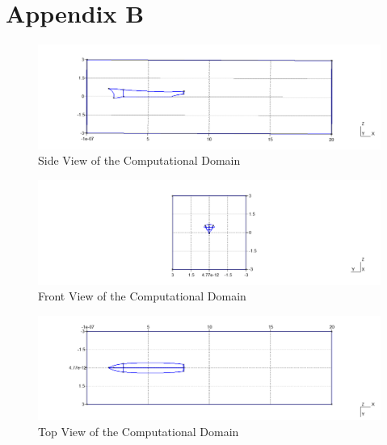 \documentclass[12pt]{article} %
\begin{document}
\clearpage
\section*{Appendix B}
\begin{figure}[ht]
    \centering
    \includegraphics[width=1\textwidth]{domain_1.png}
    \caption{Side View of the Computational Domain}
\end{figure}
\begin{figure}[ht]
    \centering
    \includegraphics[width=1\textwidth]{domain_2.png}
    \caption{Front View of the Computational Domain}
\end{figure}
\begin{figure}[ht]
    \centering
    \includegraphics[width=1\textwidth]{domain_3.png}
    \caption{Top View of the Computational Domain}
\end{figure}

\clearpage
\end{document}
